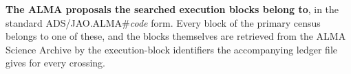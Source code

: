 \begin{table}
\centering
\scriptsize
\caption{\textbf{The \NProjCodes{} ALMA proposals the searched execution
blocks belong to}, in the standard
\mbox{ADS/JAO.ALMA\#\textit{code}} form. Every block of the primary census
belongs to one of these, and the blocks themselves are retrieved from the
ALMA Science Archive by the execution-block identifiers
the accompanying ledger file gives for every crossing.\ProjCodeUnresClause}
\label{tab:projcodes}

\end{table}
